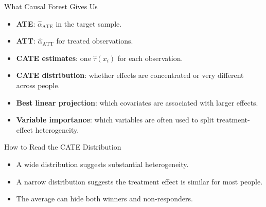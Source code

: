 \documentclass[hyperref={pdfpagelabels=false}]{beamer}
\begin{document}
\begin{frame}{What Causal Forest Gives Us}
\begin{itemize}
  \item \textbf{ATE}: $\hat{\alpha}_{\text{ATE}}$ in the target sample.
  \vspace{0.2cm}
  \item \textbf{ATT}: $\hat{\alpha}_{\text{ATT}}$ for treated observations.
  \vspace{0.2cm}
  \item \textbf{CATE estimates}: one $\hat{\tau}(x_i)$ for each observation.
  \vspace{0.2cm}
  \item \textbf{CATE distribution}: whether effects are concentrated or very different across people.
  \vspace{0.2cm}
  \item \textbf{Best linear projection}: which covariates are associated with larger effects.
  \vspace{0.2cm}
  \item \textbf{Variable importance}: which variables are often used to split treatment-effect heterogeneity.
\end{itemize}
\end{frame}

\begin{frame}{How to Read the CATE Distribution}
\begin{center}
\end{center}

\vspace{0.2cm}
\begin{itemize}
  \item A wide distribution suggests substantial heterogeneity.
  \item A narrow distribution suggests the treatment effect is similar for most people.
  \item The average can hide both winners and non-responders.
\end{itemize}
\end{frame}
\end{document}
